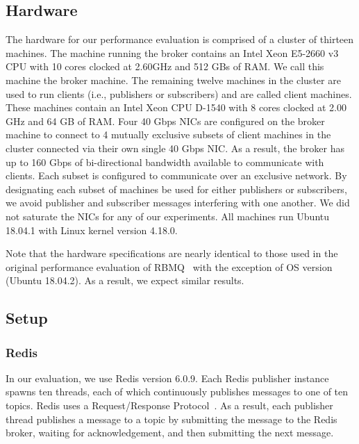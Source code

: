 \documentclass[letterpaper,twocolumn,10pt]{article}
\begin{document}
\subsection{Hardware}
The hardware for our performance evaluation is comprised of a cluster of thirteen machines.
The machine running the broker contains an Intel Xeon E5-2660 v3 CPU with 10 cores clocked at 2.60GHz and 512 GBs of RAM.  We call this machine the broker machine.
The remaining twelve machines in the cluster are used to run clients (i.e., publishers or subscribers) and are called client machines.
These machines contain an Intel Xeon CPU D-1540 with 8 cores clocked at 2.00 GHz and 64 GB of RAM.
Four 40 Gbps NICs are configured on the broker machine to connect to 4 mutually exclusive subsets of client machines in the cluster connected via their own single 40 Gbps NIC.
As a result, the broker has up to 160 Gbps of bi-directional bandwidth available to communicate with clients.
Each subset is configured to communicate over an exclusive network.
By designating each subset of machines be used for either publishers or subscribers, we avoid publisher and subscriber messages interfering with one another.
We did not saturate the NICs for any of our experiments.
All machines run Ubuntu 18.04.1 with Linux kernel version 4.18.0.

Note that the hardware specifications are nearly identical to those used in the original performance evaluation of RBMQ~\cite{Rocketbufs,hoang2019building} with the exception of OS version (Ubuntu 18.04.2).
As a result, we expect similar results.


\subsection{Setup}
\subsubsection{Redis}
In our evaluation, we use Redis version 6.0.9.
Each Redis publisher instance spawns ten threads, each of which continuously publishes messages to one of ten topics.
Redis uses a Request/Response Protocol~\cite{redis-req-resp}.
As a result, each publisher thread publishes a message to a topic by submitting the message to the Redis broker, waiting for acknowledgement, and then submitting the next message.
\end{document}
